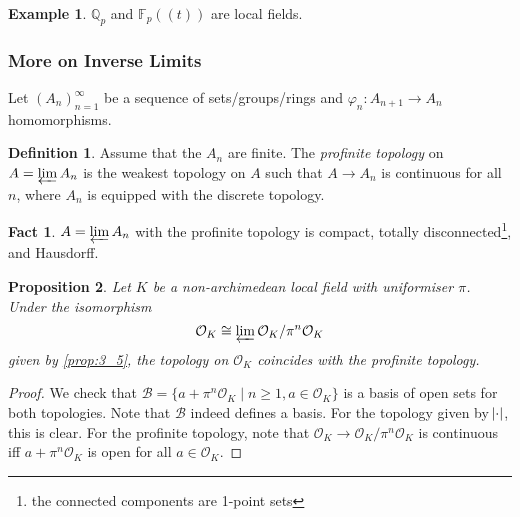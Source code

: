 \documentclass[11pt]{article}
\theoremstyle{definition}
\newtheorem{definition}{Definition}[subsection]
\newtheorem*{example}{Example}
\newtheorem*{fact}{Fact}
\theoremstyle{plain}
\newtheorem{proposition}[definition]{Proposition}
\theoremstyle{remark}
\newcommand{\FF}{\mathbb{F}}
\newcommand{\QQ}{\mathbb{Q}}
\newcommand{\cO}{\mathcal{O}}
\begin{document}
\begin{example}
    $\QQ_p$ and $\FF_p((t))$ are local fields.
\end{example}

\subsubsection*{More on Inverse Limits}
Let $(A_n)_{n=1}^\infty$ be a sequence of sets/groups/rings and $\varphi_n : A_{n+1} \to A_n$ homomorphisms.

\begin{definition}\label{def:7_3}
    Assume that the $A_n$ are finite. The \emph{profinite topology} on $A = \varprojlim A_n$ is the weakest topology on $A$ such that $A \to A_n$ is continuous for all $n$, where $A_n$ is equipped with the discrete topology.
\end{definition}

\begin{fact}
    $A = \varprojlim A_n$ with the profinite topology is compact, totally disconnected\footnote{the connected components are 1-point sets}, and Hausdorff.
\end{fact}

\begin{proposition}\label{prop:7_4}
    Let $K$ be a non-archimedean local field with uniformiser $\pi$. Under the isomorphism
    \begin{equation*}
        \cO_K \cong \varprojlim \cO_K / \pi^n \cO_K
    \end{equation*}
    given by \autoref{prop:3_5}, the topology on $\cO_K$ coincides with the profinite topology.
\end{proposition}
\begin{proof}
    We check that $\mathcal{B} = \{a + \pi^n\cO_K \mid n \ge 1, a \in \cO_K\}$ is a basis of open sets for both topologies. Note that $\mathcal{B}$ indeed defines a basis. For the topology given by $\abs{\cdot}$, this is clear. For the profinite topology, note that $\cO_K \to \cO_K / \pi^n \cO_K$ is continuous iff $a + \pi^n \cO_K$ is open for all $a \in \cO_K$.
\end{proof}
\end{document}
